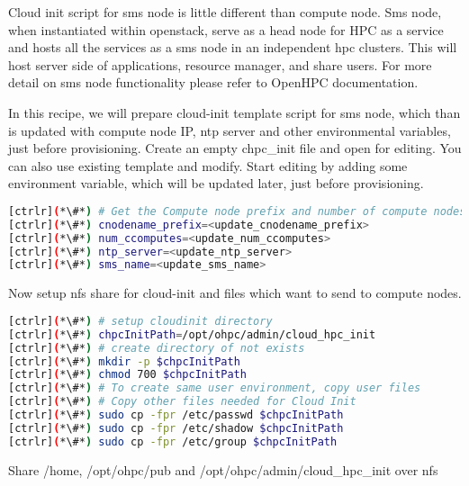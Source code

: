Cloud init script for sms node is little different than compute node. Sms node, when instantiated within openstack, serve as a head node for HPC as a service and hosts all the services as a sms node in an independent hpc clusters. This will host server side of applications, resource manager, and share users. For more detail on sms node functionality please refer to OpenHPC documentation.

In this recipe, we will prepare cloud-init template script for sms node, which than is updated with compute node IP, ntp server and other environmental variables, just before provisioning. 
Create an empty chpc\_init file and open for editing. You can also use existing template and modify. Start editing by adding some environment variable, which will be updated later, just before provisioning.



\begin{lstlisting}[language=bash,keywords={}]
[ctrlr](*\#*) # Get the Compute node prefix and number of compute nodes
[ctrlr](*\#*) cnodename_prefix=<update_cnodename_prefix>
[ctrlr](*\#*) num_ccomputes=<update_num_ccomputes>
[ctrlr](*\#*) ntp_server=<update_ntp_server>
[ctrlr](*\#*) sms_name=<update_sms_name>
\end{lstlisting} 

Now setup nfs share for cloud-init and files which want to send to compute nodes.


\begin{lstlisting}[language=bash,keywords={}]
[ctrlr](*\#*) # setup cloudinit directory
[ctrlr](*\#*) chpcInitPath=/opt/ohpc/admin/cloud_hpc_init
[ctrlr](*\#*) # create directory of not exists
[ctrlr](*\#*) mkdir -p $chpcInitPath
[ctrlr](*\#*) chmod 700 $chpcInitPath
[ctrlr](*\#*) # To create same user environment, copy user files 
[ctrlr](*\#*) # Copy other files needed for Cloud Init
[ctrlr](*\#*) sudo cp -fpr /etc/passwd $chpcInitPath
[ctrlr](*\#*) sudo cp -fpr /etc/shadow $chpcInitPath
[ctrlr](*\#*) sudo cp -fpr /etc/group $chpcInitPath
\end{lstlisting} 

Share /home, /opt/ohpc/pub and /opt/ohpc/admin/cloud\_hpc\_init over nfs


